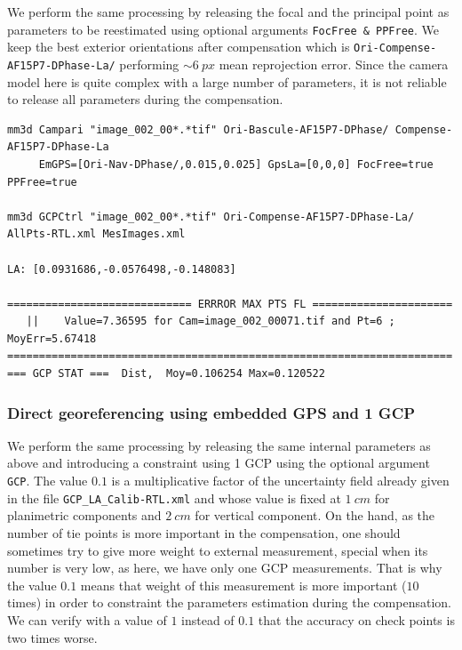 We perform the same processing by releasing the focal and the principal point as parameters to be reestimated using optional arguments {\tt FocFree \& PPFree}. We keep the best exterior orientations after compensation which is {\tt Ori-Compense-AF15P7-DPhase-La/} performing $\sim 6\ px$ mean reprojection error. Since the camera model here is quite complex with a large number of parameters, it is not reliable to release all parameters during the compensation.
\begin{verbatim}
mm3d Campari "image_002_00*.*tif" Ori-Bascule-AF15P7-DPhase/ Compense-AF15P7-DPhase-La 
     EmGPS=[Ori-Nav-DPhase/,0.015,0.025] GpsLa=[0,0,0] FocFree=true PPFree=true
     
mm3d GCPCtrl "image_002_00*.*tif" Ori-Compense-AF15P7-DPhase-La/ AllPts-RTL.xml MesImages.xml

LA: [0.0931686,-0.0576498,-0.148083]

============================= ERRROR MAX PTS FL ======================
   ||    Value=7.36595 for Cam=image_002_00071.tif and Pt=6 ; MoyErr=5.67418
======================================================================
=== GCP STAT ===  Dist,  Moy=0.106254 Max=0.120522
\end{verbatim}


\subsubsection{Direct georeferencing using embedded GPS and 1 GCP}

We perform the same processing by releasing the same internal parameters as above and introducing a constraint using 1 GCP using the optional argument {\tt GCP}. The value $0.1$ is a multiplicative factor of the uncertainty field already given in the file {\tt GCP\_LA\_Calib-RTL.xml} and whose value is fixed at $1\ cm$ for planimetric components and $2\ cm$ for vertical component. On the hand, as the number of tie points is more important in the compensation, one should sometimes try to give more weight to external measurement, special when its number is very low, as here, we have only one GCP measurements. That is why the value $0.1$ means that weight of this measurement is more important ($10$ times) in order to constraint the parameters estimation during the compensation. We can verify with a value of $1$ instead of $0.1$ that the accuracy on check points is two times worse.

